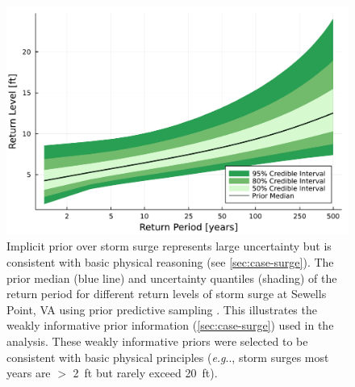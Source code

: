 \documentclass[ef,draft]{agutexSI2019}
\makeatletter
\DeclareRobustCommand\onedot{\futurelet\@let@token\@onedot}
\def\@onedot{\ifx\@let@token.\else.\null\fi\xspace}
\def\eg{\emph{e.g}\onedot} \def\Eg{\emph{E.g}\onedot}
\makeatother
\begin{document}
\begin{figure}
    \centering
    \includegraphics[width=\textwidth]{surge-prior-return}
    \caption{
        Implicit prior over storm surge represents large uncertainty but is consistent with basic physical reasoning (see \cref{sec:case-surge}).
        The prior median (blue line) and uncertainty quantiles (shading) of the return period for different return levels of storm surge at Sewells Point, VA using prior predictive sampling \cite{gelman_workflow:2020}.
        This illustrates the weakly informative prior information (\cref{sec:case-surge}) used in the analysis.
        These weakly informative priors were selected to be consistent with basic physical principles (\eg, storm surges most years are $>$ \SI{2}{ft} but rarely exceed \SI{20}{ft}).
    }\label{fig:surge-prior-return}
\end{figure}
\end{document}
